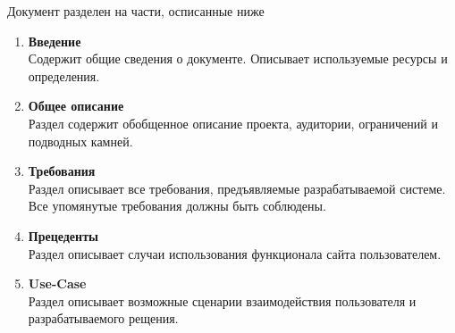 
Документ разделен на части, осписанные ниже
\begin{enumerate}
      \item \textbf{Введение} \\
            Содержит общие сведения о документе. Описывает
            используемые ресурсы и определения.

      \item \textbf{Общее описание} \\
            Раздел содержит обобщенное описание проекта,
            аудитории, ограничений и подводных камней.

      \item \textbf{Требования} \\
            Раздел описывает все требования, предъявляемые
            разрабатываемой системе. Все упомянутые требования
            должны быть соблюдены.

      \item \textbf{Прецеденты} \\
            Раздел описывает случаи использования функционала сайта пользователем.

      \item \textbf{Use-Case} \\
            Раздел описывает возможные сценарии взаимодействия
            пользователя и разрабатываемого рещения.

\end{enumerate}
